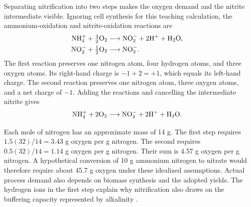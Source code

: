 Separating nitrification into two steps makes the oxygen demand and the nitrite intermediate visible. Ignoring cell synthesis for this teaching calculation, the ammonium-oxidation and nitrite-oxidation reactions are
\begin{align}
\equationname{Idealized ammonium oxidation to nitrite}
\mathrm{NH_4^+}+\tfrac32\mathrm{O_2}
&\longrightarrow\mathrm{NO_2^-}+2\mathrm{H^+}+\mathrm{H_2O},
\label{eq:teaching_ammonium_oxidation}\\
\equationname{Idealized nitrite oxidation to nitrate}
\mathrm{NO_2^-}+\tfrac12\mathrm{O_2}
&\longrightarrow\mathrm{NO_3^-}.
\label{eq:teaching_nitrite_oxidation}
\end{align}
The first reaction preserves one nitrogen atom, four hydrogen atoms, and three oxygen atoms. Its right-hand charge is $-1+2=+1$, which equals its left-hand charge. The second reaction preserves one nitrogen atom, three oxygen atoms, and a net charge of $-1$. Adding the reactions and cancelling the intermediate nitrite gives
\begin{equation}
\equationname{Idealized overall nitrification reaction}
\mathrm{NH_4^+}+2\mathrm{O_2}
\longrightarrow\mathrm{NO_3^-}+2\mathrm{H^+}+\mathrm{H_2O}.
\label{eq:teaching_overall_nitrification}
\end{equation}

Each mole of nitrogen has an approximate mass of 14 g. The first step requires $1.5(32)/14=3.43$ g oxygen per g nitrogen. The second requires $0.5(32)/14=1.14$ g oxygen per g nitrogen. Their sum is 4.57 g oxygen per g nitrogen. A hypothetical conversion of 10 g ammonium nitrogen to nitrate would therefore require about 45.7 g oxygen under these idealized assumptions. Actual process demand also depends on biomass synthesis and the adopted yields. The hydrogen ions in the first step explain why nitrification also draws on the buffering capacity represented by alkalinity \citep{Guerrero2011,Henze2006}.

